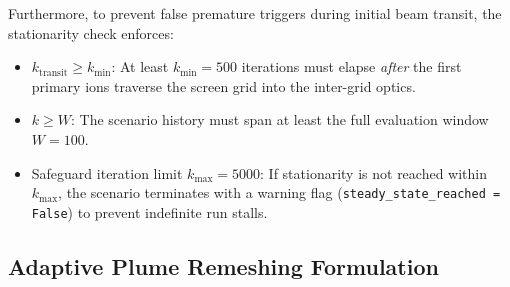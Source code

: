\documentclass[11pt,a4paper]{article}
\begin{document}
Furthermore, to prevent false premature triggers during initial beam transit, the stationarity check enforces:
\begin{itemize}[nosep]
    \item $k_{\mathrm{transit}} \ge k_{\mathrm{min}}$: At least $k_{\mathrm{min}} = 500$ iterations must elapse \emph{after} the first primary ions traverse the screen grid into the inter-grid optics.
    \item $k \ge W$: The scenario history must span at least the full evaluation window $W = 100$.
    \item Safeguard iteration limit $k_{\max} = 5000$: If stationarity is not reached within $k_{\max}$, the scenario terminates with a warning flag (\texttt{steady\_state\_reached = False}) to prevent indefinite run stalls.
\end{itemize}

\subsection{Adaptive Plume Remeshing Formulation}
\label{sec:adaptive_plume_remeshing}
\end{document}

